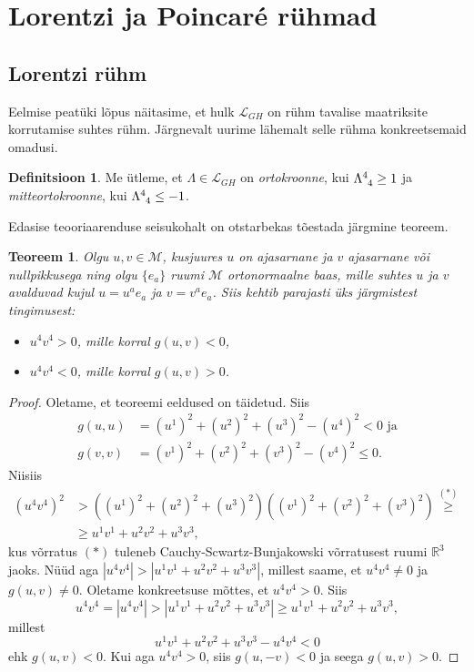 \documentclass[12pt,a4paper,oneside]{article}
\theoremstyle{plain}
\newtheorem{teoreem}{Teoreem}[section]
\theoremstyle{definition}
\newtheorem{definitsioon}{Definitsioon}[section]
\numberwithin{equation}{section}
\def\R{{\mathbb R}}
\def\L{{\mathcal L}}
\def\M{{\mathcal M}}
\begin{document}
\newpage
\section{Lorentzi ja Poincar\'e rühmad}

\subsection{Lorentzi rühm}

Eelmise peatüki lõpus näitasime, et hulk $\L_{GH}$ on rühm 
tavalise maatriksite korrutamise suhtes rühm. Järgnevalt uurime 
lähemalt selle rühma konkreetsemaid omadusi.

\begin{definitsioon}
Me ütleme, et $\Lambda \in \L_{GH}$ on \emph{ortokroonne}, kui 
$\Lambda\indices{^4_4} \geq 1$ ja \emph{mitteortokroonne}, kui 
$\Lambda\indices{^4_4} \leq -1$.
\end{definitsioon}

Edasise teooriaarenduse seisukohalt on otstarbekas tõestada järgmine 
teoreem.
\begin{teoreem} \textnormal{\cite[teoreem 1.3.1]{Naber}} 
\label{teoreem:ajasarnased_vektorid}
Olgu $u, v \in \M$, kusjuures $u$ on ajasarnane ja $v$ ajasarnane 
või nullpikkusega ning olgu $\{e_a\}$ ruumi $\M$ ortonormaalne baas, 
mille suhtes $u$ ja $v$ avalduvad kujul $u = u^a e_a$ ja 
$v = v^a e_a$. Siis kehtib parajasti üks järgmistest tingimusest:
\begin{itemize}
\item[$(a)$] $u^4 v^4 > 0$, mille korral $g\left(u, v\right) < 0$,
\item[$(b)$] $u^4 v^4 < 0$, mille korral $g\left(u, v\right) > 0$.
\end{itemize}
\end{teoreem}
\begin{proof}
Oletame, et teoreemi eeldused on täidetud. Siis
\begin{align*}
g \left(u, u\right) &= \left(u^1\right)^2 + \left(u^2\right)^2 + 
	\left(u^3\right)^2 - \left(u^4\right)^2 < 0 \text{ ja} \\
g \left(v, v\right) &= \left(v^1\right)^2 + \left(v^2\right)^2 + 
	\left(v^3\right)^2 - \left(v^4\right)^2 \leq 0.
\end{align*}
Niisiis
\begin{align*}
\left(u^4 v^4\right)^2 &> \left( \left(u^1\right)^2 + 
\left(u^2\right)^2 + \left(u^3\right)^2 \right) 
\left( \left(v^1\right)^2 + \left(v^2\right)^2 + 
\left(v^3\right)^2 \right) \overset{(*)}{\geq} \\
&\geq u^1 v^1 + u^2 v^2 + u^3 v^3,
\end{align*}
kus võrratus $(*)$ tuleneb Cauchy-Scwartz-Bunjakowski võrratusest 
ruumi $\R^3$ jaoks.
Nüüd aga $|u^4 v^4| > |u^1 v^1 + u^2 v^2 + u^3 v^3|$, millest saame, 
et $u^4 v^4 \neq 0$ ja $g\left (u, v\right ) \neq 0$.
Oletame konkreetsuse mõttes, et $u^4 v^4 > 0$. Siis
\[u^4 v^4 = |u^4 v^4| > |u^1 v^1 + u^2 v^2 + u^3 v^3| 
\geq u^1 v^1 + u^2 v^2 + u^3 v^3,\]
millest
\[u^1 v^1 + u^2 v^2 + u^3 v^3 - u^4 v^4 < 0\]
ehk $g\left (u, v\right ) < 0$.
Kui aga $u^4 v^4 > 0$, siis $g\left (u, -v\right ) < 0$ ja seega 
$g \left (u, v\right ) > 0$.
\end{proof}
\end{document}
